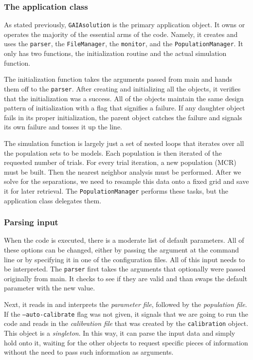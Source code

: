 \documentclass[10pt,a4paper,final]{article}
\numberwithin{equation}{section}
\begin{document}
\begin{multicols}{2}[]
			\subsubsection{The application class}

				As stated previously, \texttt{GAIAsolution} is the primary application
				object. It owns or operates the majority of the essential arms of the code. 
				Namely, it creates and uses the \texttt{parser}, the \texttt{FileManager}, 
				the \texttt{monitor}, and the \texttt{PopulationManager}. It only has two
				functions, the initialization routine and the actual simulation function.

				The initialization function takes the arguments passed from main and hands
				them off to the \texttt{parser}. After creating and initializing all the
				objects, it verifies that the initialization was a success. All of the objects
				maintain the same design pattern of initialization with a flag that signifies
				a failure. If any daughter object fails in its proper initialization, the parent
				object catches the failure and signals its own failure and tosses it up the line.

				The simulation function is largely just a set of nested loops that iterates over
				all the population sets to be models. Each population is then iterated of the
				requested number of trials. For every trial iteration, a new population (MCR) must
				be built. Then the nearest neighbor analysis must be performed. After we solve
				for the separations, we need to resample this data onto a fixed grid and save it
				for later retrieval. The \texttt{PopulationManager} performs these tasks, but
				the application class delegates them.

			\subsubsection{Parsing input}
				
				When the code is executed, there is a moderate list of default parameters.
				All of these options can be changed, either by passing the argument at the
				command line or by specifying it in one of the configuration files. All of 
				this input needs to be interpreted. The \texttt{parser} first takes the
				arguments that optionally were passed originally from main. It checks to see
				if they are valid and than swaps the default parameter with the new value.

				Next, it reads in and interprets the \textit{parameter file}, followed by
				the \textit{population file}. If the \texttt{--auto-calibrate} flag was
				not given, it signals that we are going to run the code and reads in the
				\textit{calibration file} that was created by the \texttt{calibration}
				object. This object is a \textit{singleton}. In this way, it can parse
				the input data and simply hold onto it, waiting for the other objects to
				request specific pieces of information without the need to pass such
				information as arguments.
				

\end{multicols}
\end{document}
